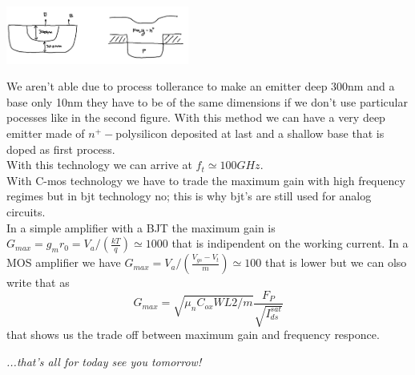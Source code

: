 \centering
\includegraphics[width=0.45\textwidth]{bjtfinal.png}\\
\raggedright

We aren't able due to process tollerance to make an emitter deep 300nm and a base only 10nm they have to be of the same dimensions if we don't use particular pocesses like in the second figure. With this method we can have a very deep emitter made of $n^+-$polysilicon deposited at last and a shallow base that is doped as first process.\\
With this technology we can arrive at $f_t\simeq 100GHz$.\\

\vspace{5mm}
With C-mos technology we have to trade the maximum gain with high frequency regimes but in bjt technology no; this is why bjt's are still used for analog circuits.\\
In a simple amplifier with a BJT the maximum gain is $G_{max}=g_m r_0=V_a/(\frac{kT}{q})\simeq 1000$ that is indipendent on the working current. In a MOS amplifier we have $G_{max}=V_a/\left(\frac{V_{gs}-V_t}{m}\right)\simeq100$ that is lower but we can olso write that as 
\begin{equation}
G_{max}=\sqrt{\mu_nC_{ox}WL2/m}\frac{F_P}{\sqrt{I_{ds}^{sat}}}
\end{equation}
that shows us the trade off between maximum gain and frequency responce.


\vspace{10mm}
\raggedleft
{\it ...that's all for today see you tomorrow!}
